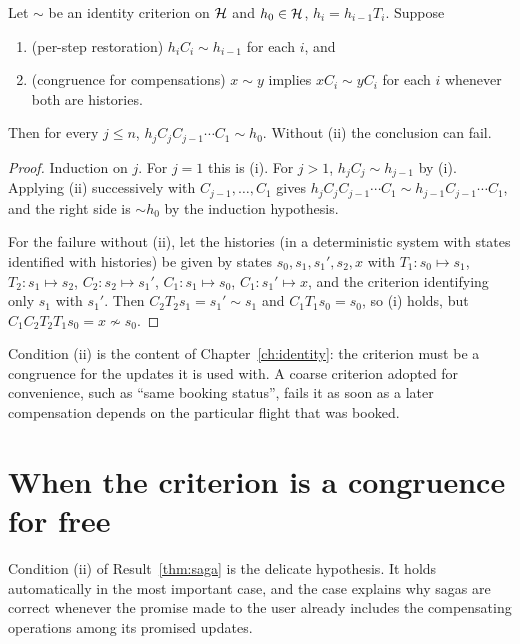 \begin{newresult}\label{thm:saga}
Let $\sim$ be an identity criterion on $\mathcal{H}$ and $h_0\in\mathcal{H}$, $h_i=h_{i-1}T_i$. Suppose
\begin{enumerate}[nosep,label=(\roman*)]
  \item (per-step restoration) $h_iC_i\sim h_{i-1}$ for each $i$, and
  \item (congruence for compensations) $x\sim y$ implies $xC_i\sim yC_i$ for each $i$ whenever both are histories.
\end{enumerate}
Then for every $j\le n$, $h_jC_jC_{j-1}\cdots C_1\sim h_0$. Without (ii) the conclusion can fail.
\end{newresult}
\begin{proof}
Induction on $j$. For $j=1$ this is (i). For $j>1$, $h_jC_j\sim h_{j-1}$ by (i). Applying (ii) successively with $C_{j-1},\dots,C_1$ gives $h_jC_jC_{j-1}\cdots C_1\sim h_{j-1}C_{j-1}\cdots C_1$, and the right side is $\sim h_0$ by the induction hypothesis.

For the failure without (ii), let the histories (in a deterministic system with states identified with histories) be given by states $s_0,s_1,s_1',s_2,x$ with $T_1:s_0\mapsto s_1$, $T_2:s_1\mapsto s_2$, $C_2:s_2\mapsto s_1'$, $C_1:s_1\mapsto s_0$, $C_1:s_1'\mapsto x$, and the criterion identifying only $s_1$ with $s_1'$. Then $C_2T_2s_1=s_1'\sim s_1$ and $C_1T_1s_0=s_0$, so (i) holds, but $C_1C_2T_2T_1s_0=x\not\sim s_0$.
\end{proof}

Condition (ii) is the content of Chapter~\ref{ch:identity}: the criterion must be a congruence for the updates it is used with. A coarse criterion adopted for convenience, such as ``same booking status'', fails it as soon as a later compensation depends on the particular flight that was booked.


\section{When the criterion is a congruence for free}\label{sec:congruence-free}

Condition (ii) of Result~\ref{thm:saga} is the delicate hypothesis. It holds automatically in the most important case, and the case explains why sagas are correct whenever the promise made to the user already includes the compensating operations among its promised updates.

